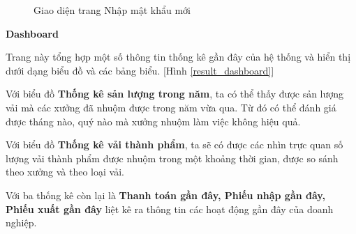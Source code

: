 \begin{figure}[H]
    \begin{center}
        \caption{Giao diện trang Nhập mật khẩu mới}
        \label{result_quen_mat_khau_new_password}
    \end{center}
\end{figure}


\textbf{Dashboard}

Trang này tổng hợp một số thông tin thống kê gần đây của hệ thống và hiển thị dưới dạng biểu đồ và các bảng biểu. [Hình \ref{result_dashboard}] \par

Với biểu đồ \textbf{Thống kê sản lượng trong năm}, ta có thể thấy được sản lượng vải mà các xưởng đã nhuộm được trong năm vừa qua. Từ đó có thể đánh giá được tháng nào, quý nào mà xưởng nhuộm làm việc không hiệu quả. \par

Với biểu đồ \textbf{Thống kê vải thành phẩm}, ta sẽ có được các nhìn trực quan số lượng vải thành phẩm được nhuộm trong một khoảng thời gian, được so sánh theo xưởng và theo loại vải. \par

Với ba thống kê còn lại là \textbf{Thanh toán gần đây, Phiếu nhập gần đây, Phiếu xuất gần đây} liệt kê ra thông tin các hoạt động gần đây của doanh nghiệp. \par

